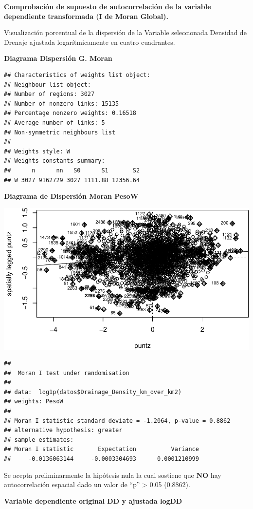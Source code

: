 \documentclass[11pt,]{article}
\begin{document}
\textbf{Comprobación de supuesto de autocorrelación de la variable
dependiente transformada (I de Moran Global).}

Visualización porcentual de la dispersión de la Variable seleccionada
Densidad de Drenaje ajustada logarítmicamente en cuatro cuadrantes.

\textbf{Diagrama Dispersión G. Moran}

\begin{verbatim}
## Characteristics of weights list object:
## Neighbour list object:
## Number of regions: 3027 
## Number of nonzero links: 15135 
## Percentage nonzero weights: 0.16518 
## Average number of links: 5 
## Non-symmetric neighbours list
## 
## Weights style: W 
## Weights constants summary:
##      n      nn   S0      S1       S2
## W 3027 9162729 3027 1111.88 12356.64
\end{verbatim}

\textbf{Diagrama de Dispersión Moran PesoW}

\includegraphics{proyecto_f_files/figure-latex/unnamed-chunk-14-1.pdf}

\begin{verbatim}
## 
##  Moran I test under randomisation
## 
## data:  log1p(datos$Drainage_Density_km_over_km2)  
## weights: PesoW    
## 
## Moran I statistic standard deviate = -1.2064, p-value = 0.8862
## alternative hypothesis: greater
## sample estimates:
## Moran I statistic       Expectation          Variance 
##     -0.0136063144     -0.0003304693      0.0001210999
\end{verbatim}

Se acepta preliminarmente la hipótesis nula la cual sostiene que
\textbf{NO} hay autocorrelación espacial dado un valor de ``p''
\textgreater{} 0.05 (0.8862).

\textbf{Variable dependiente original DD y ajustada logDD}
\end{document}
